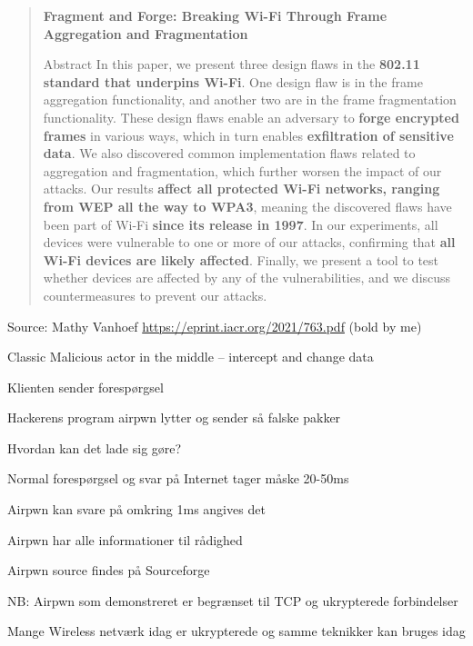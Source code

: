 \documentclass[Screen16to9,17pt]{foils}
\begin{document}
\begin{quote}\small
{\bf Fragment and Forge: Breaking Wi-Fi Through
Frame Aggregation and Fragmentation}

Abstract
In this paper, we present three design flaws in the {\bf 802.11
standard that underpins Wi-Fi}. One design flaw is in the frame
aggregation functionality, and another two are in the frame
fragmentation functionality. These design flaws enable an
adversary to {\bf forge encrypted frames} in various ways, which in
turn enables {\bf exfiltration of sensitive data}. We also discovered
common implementation flaws related to aggregation and
fragmentation, which further worsen the impact of our attacks.
Our results {\bf affect all protected Wi-Fi networks, ranging from
WEP all the way to WPA3}, meaning the discovered flaws
have been part of Wi-Fi {\bf since its release in 1997}. In our
experiments, all devices were vulnerable to one or more of our
attacks, confirming that {\bf all Wi-Fi devices are likely affected}.
Finally, we present a tool to test whether devices are affected
by any of the vulnerabilities, and we discuss countermeasures
to prevent our attacks.

\end{quote}
Source: Mathy Vanhoef \url{https://eprint.iacr.org/2021/763.pdf} (bold by me)





Classic Malicious actor in the middle -- intercept and change data



\begin{list1}
\item Klienten sender forespørgsel
\item Hackerens program airpwn lytter og sender så falske pakker
\item Hvordan kan det lade sig gøre?
\begin{list2}
\item Normal forespørgsel og svar på Internet tager måske 20-50ms
\item Airpwn kan svare på omkring 1ms angives det
\item Airpwn har alle informationer til rådighed
\end{list2}
\item Airpwn source findes på Sourceforge\\
\item NB: Airpwn som demonstreret er begrænset til TCP og ukrypterede
  forbindelser
\item Mange Wireless netværk idag er ukrypterede og samme teknikker kan bruges idag
\end{list1}
\end{document}
